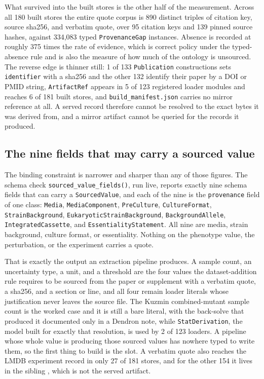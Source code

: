 What survived into the built stores is the other half of the measurement. Across all 180 built
stores the entire quote corpus is 890 distinct triples of citation key, source sha256, and
verbatim quote, over 95 citation keys and 139 pinned source hashes, against 334,083 typed
\texttt{ProvenanceGap} instances. Absence is recorded at roughly 375 times the rate of
evidence, which is correct policy under the typed-absence rule and is also the measure of how
much of the ontology is unsourced. The reverse edge is thinner still: 1 of 133
\texttt{Publication} constructions sets \texttt{identifier} with a sha256 and the other 132
identify their paper by a DOI or PMID string, \texttt{ArtifactRef} appears in 5 of 123
registered loader modules and reaches 6 of 181 built stores, and \texttt{build\_manifest.json}
carries no mirror reference at all. A served record therefore cannot be resolved to the exact
bytes it was derived from, and a mirror artifact cannot be queried for the records it produced.

\subsection{The nine fields that may carry a sourced value}\label{sec:pipeline-slot}

The binding constraint is narrower and sharper than any of those figures. The schema check
\texttt{sourced\_value\_fields()}, run live, reports exactly nine schema fields that can carry
a \texttt{SourcedValue}, and each of the nine is the \texttt{provenance} field of one class:
\texttt{Media}, \texttt{MediaComponent}, \texttt{PreCulture}, \texttt{CultureFormat},
\texttt{StrainBackground}, \texttt{EukaryoticStrainBackground}, \texttt{BackgroundAllele},
\texttt{IntegratedCassette}, and \texttt{EssentialityStatement}. All nine are media, strain
background, culture format, or essentiality. Nothing on the phenotype value, the perturbation,
or the experiment carries a quote.

That is exactly the output an extraction pipeline produces. A sample count, an uncertainty type,
a unit, and a threshold are the four values the dataset-addition rule requires to be sourced
from the paper or supplement with a verbatim quote, a sha256, and a section or line, and all
four remain loader literals whose justification never leaves the source file. The Kuzmin
combined-mutant sample count is the worked case and it is still a bare literal, with the
back-solve that produced it documented only in a Dendron note, while \texttt{StatDerivation},
the model built for exactly that resolution, is used by 2 of 123 loaders. A pipeline whose
whole value is producing those sourced values has nowhere typed to write them, so the first
thing to build is the slot. A verbatim quote also reaches the LMDB experiment record in only 27
of 181 stores, and for the other 154 it lives in the sibling
, which is not the served artifact.

